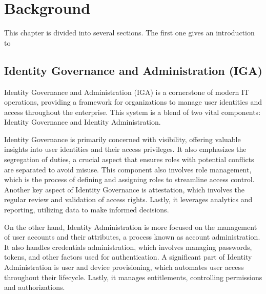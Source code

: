 
%

\chapter{Background}
\label{cha:Background}


This chapter is divided into several sections. The first one gives an introduction to

\section{Identity Governance and Administration (IGA)}
\label{sec:IGA}

Identity Governance and Administration (IGA) is a cornerstone of modern IT operations, providing a framework for organizations to manage user identities and access throughout the enterprise. This system is a blend of two vital components: Identity Governance and Identity Administration.

Identity Governance is primarily concerned with visibility, offering valuable insights into user identities and their access privileges. It also emphasizes the segregation of duties, a crucial aspect that ensures roles with potential conflicts are separated to avoid misuse. This component also involves role management, which is the process of defining and assigning roles to streamline access control. Another key aspect of Identity Governance is attestation, which involves the regular review and validation of access rights. Lastly, it leverages analytics and reporting, utilizing data to make informed decisions.

On the other hand, Identity Administration is more focused on the management of user accounts and their attributes, a process known as account administration. It also handles credentials administration, which involves managing passwords, tokens, and other factors used for authentication. A significant part of Identity Administration is user and device provisioning, which automates user access throughout their lifecycle. Lastly, it manages entitlements, controlling permissions and authorizations.

